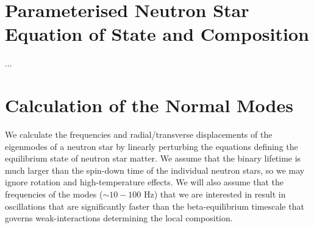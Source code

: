 \documentclass[fleqn,usenatbib]{mnras}
\begin{document}
\section{Parameterised Neutron Star Equation of State and Composition}














...









\section{Calculation of the Normal Modes}
\hspace{\parindent}We calculate the frequencies and radial/transverse displacements of the eigenmodes of a neutron star by linearly perturbing the equations defining the equilibrium state of neutron star matter. We assume that the binary lifetime is much larger than the spin-down time of the individual neutron stars, so we may ignore rotation and high-temperature effects. We will also assume that the frequencies of the modes ($\sim 10 - 100$ Hz) that we are interested in result in oscillations that are significantly faster than the beta-equilibrium timescale that governs weak-interactions determining the local composition. 




\end{document}
